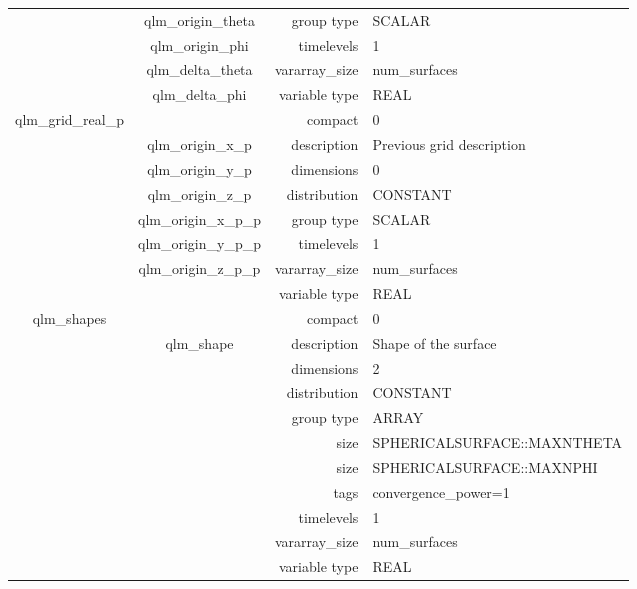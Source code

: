 \begin{tabular*}{150mm}{|c|c@{\extracolsep{\fill}}|rl|}
 & qlm\_origin\_theta & group type & SCALAR \\ 
 & qlm\_origin\_phi & timelevels & 1 \\ 
 & qlm\_delta\_theta & vararray\_size & num\_surfaces \\ 
 & qlm\_delta\_phi & variable type & REAL \\ 
\hline 
qlm\_grid\_real\_p &  & compact & 0 \\ 
 & qlm\_origin\_x\_p & description & Previous grid description \\ 
 & qlm\_origin\_y\_p & dimensions & 0 \\ 
 & qlm\_origin\_z\_p & distribution & CONSTANT \\ 
 & qlm\_origin\_x\_p\_p & group type & SCALAR \\ 
 & qlm\_origin\_y\_p\_p & timelevels & 1 \\ 
 & qlm\_origin\_z\_p\_p & vararray\_size & num\_surfaces \\ 
 &  & variable type & REAL \\ 
\hline 
qlm\_shapes &  & compact & 0 \\ 
 & qlm\_shape & description & Shape of the surface \\ 
 &  & dimensions & 2 \\ 
 &  & distribution & CONSTANT \\ 
 &  & group type & ARRAY \\ 
 &  & size & SPHERICALSURFACE::MAXNTHETA \\ 
& ~ & size & SPHERICALSURFACE::MAXNPHI \\ 
 &  & tags & convergence\_power=1 \\ 
 &  & timelevels & 1 \\ 
 &  & vararray\_size & num\_surfaces \\ 
 &  & variable type & REAL \\ 
\hline 
\end{tabular*} 



\vspace{5mm}
\vspace{5mm}

